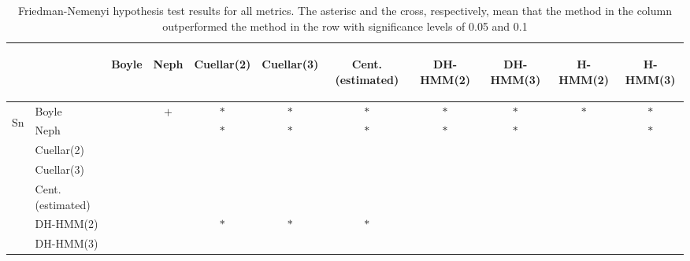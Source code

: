 \documentclass[landscape, 8pt]{report}
\begin{document}
\begin{table}[h!]
\label{tab:friedman.nemenyi}
\vspace{0.0cm}
\begin{center}
\caption{Friedman-Nemenyi hypothesis test results for all metrics. The asterisc and the cross, respectively, mean that the method in the column outperformed the method in the row with significance levels of 0.05 and 0.1}
\renewcommand{\arraystretch}{1.2}
  \begin{tabular}{ llccccccccc }
  \hline
  & & \begin{sideways}Boyle\end{sideways} &
  \begin{sideways}Neph\end{sideways} &
  \begin{sideways}Cuellar(2)\end{sideways} &
  \begin{sideways}Cuellar(3)\end{sideways} &
  \begin{sideways}Cent.(estimated)\end{sideways} &
  \begin{sideways}DH-HMM(2)\end{sideways} &
  \begin{sideways}DH-HMM(3)\end{sideways} &
  \begin{sideways}H-HMM(2)\end{sideways} &
  \begin{sideways}H-HMM(3)\end{sideways} \\
  \hline
    \multirow{7}{*}{\begin{sideways}Sn\end{sideways}}
    & Boyle &     & $+$ & $*$ & $*$ & $*$ & $*$ & $*$ & $*$ & $*$ \\
    & Neph &     &     & $*$ & $*$ & $*$ & $*$ & $*$ &     & $*$ \\
    & Cuellar(2) &     &     &     &     &     &     &     &     &     \\
    & Cuellar(3) &     &     &     &     &     &     &     &     &     \\
    & Cent.(estimated) &     &     &     &     &     &     &     &     &     \\
    & DH-HMM(2) &     &     & $*$ & $*$ & $*$ &     &     &     &     \\
    & DH-HMM(3) &     &     &     &     &     &     &     &     &     \\

\end{tabular}
\end{center}
\end{table}
\end{document}
